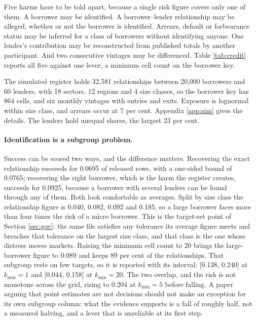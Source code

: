 \documentclass[11pt,a4paper]{article}
\theoremstyle{plain}
\theoremstyle{definition}
\begin{document}
Five harms have to be told apart, because a single risk figure covers only one of
them. A borrower may be identified. A borrower--lender relationship may be
alleged, whether or not the borrower is identified. Arrears, default or
forbearance status may be inferred for a class of borrowers without identifying
anyone. One lender's contribution may be reconstructed from published totals by
another participant. And two consecutive vintages may be differenced. Table
\ref{tab:credit} reports all five against one lever, a minimum cell count on the
borrower key.

The simulated register holds 32,581 relationships between 20,000 borrowers and 60
lenders, with 18 sectors, 12 regions and 4 size classes, so the borrower key has
864 cells, and six monthly vintages with entries and exits. Exposure is
lognormal within size class, and arrears occur at 7 per cent. Appendix
\ref{app:sim} gives the details. The lenders hold unequal shares, the largest 23
per cent.



\paragraph{Identification is a subgroup problem.} Success can be scored two ways, and the difference matters. Recovering the exact
relationship succeeds for 0.0695 of released rows, with a one-sided bound of
0.0765; recovering the right borrower, which is the harm the register creates,
succeeds for 0.0925, because a borrower with several lenders can be found through
any of them. Both look comfortable as averages. Split by size class the
relationship figure is 0.040, 0.082, 0.092 and 0.185, so a large borrower faces
more than four times the risk of a micro borrower. This is the target-set point of Section \ref{sec:gov}: the same file satisfies any
tolerance its average figure meets and breaches that tolerance on the largest size
class, and that class is the one whose distress moves markets. Raising the minimum cell count to 20 brings the large-borrower figure to 0.089 and
keeps 89 per cent of the relationships. That subgroup rests on few targets, so it
is reported with its interval: [0.138, 0.240] at $k_{\min} = 1$ and [0.044, 0.158]
at $k_{\min} = 20$. The two overlap, and the risk is not monotone across the grid,
rising to 0.204 at $k_{\min} = 5$ before falling. A paper arguing that point
estimates are not decisions should not make an exception for its own subgroup
column: what the evidence supports is a fall of roughly half, not a measured
halving, and a lever that is unreliable at its first step.
\end{document}

